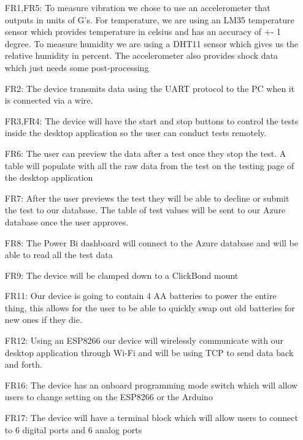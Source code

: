 \documentclass[12pt, titlepage]{article}
\begin{document}
\begin{itemize}
  \item[FR1,FR5:] To measure vibration we chose to use an accelerometer that outputs in units of G's. For temperature, we are using an LM35 temperature sensor which provides temperature in celsius and has an accuracy of +- 1 degree. To measure humidity we are using a DHT11 sensor which gives us the relative humidity in percent. The accelerometer also provides shock data which just needs some post-processing
  \item[FR2:] The device transmits data using the UART protocol to the PC when it is connected via a wire.
  \item[FR3,FR4:] The device will have the start and stop buttons to control the tests inside the desktop application so the user can conduct tests remotely.
  \item[FR6:] The user can preview the data after a test once they stop the test. A table will populate with all the raw data from the test on the testing page of the desktop application
  \item[FR7:] After the user previews the test they will be able to decline or submit the test to our database. The table of test values will be sent to our Azure database once the user approves.
  \item[FR8:] The Power Bi dashboard will connect to the Azure database and will be able to read all the test data
  \item[FR9:] The device will be clamped down to a ClickBond mount
  \item[FR11:] Our device is going to contain 4 AA batteries to power the entire thing, this allows for the user to be able to quickly swap out old batteries for new ones if they die.
  \item[FR12:] Using an ESP8266 our device will wirelessly communicate with our desktop application through Wi-Fi and will be using TCP to send data back and forth.
  \item[FR16:]  The device has an onboard programming mode switch which will allow users to change setting on the ESP8266 or the Arduino
  \item[FR17:] The device will have a terminal block which will allow users to connect to 6 digital ports and 6 analog ports      
  
\end{itemize}

\end{document}
